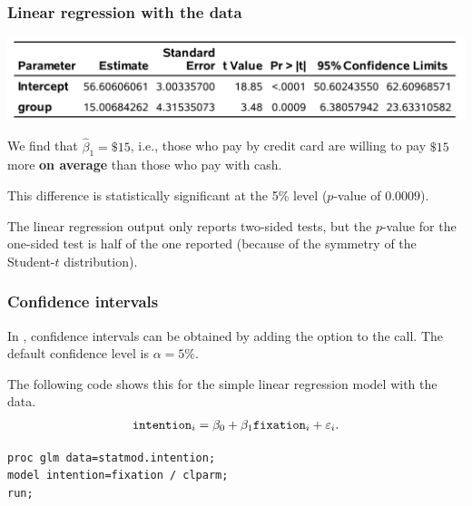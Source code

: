\documentclass{beamer}
\begin{document}
\begin{frame}[fragile]
\frametitle{Linear regression with the  data}
\begin{center}
\includegraphics[width =0.9\linewidth]{img/c2/slides3-e14}
\end{center}
\bi
\item We find that $\widehat{\beta}_1=\$15$, i.e., those who pay by credit card are willing to pay $\$15$ more \textbf{on average} than those who pay with cash. 
\item This difference is statistically significant at the 5\% level ($p$-value of $0.0009$).
\item The linear regression output only reports two-sided tests, but the $p$-value for the one-sided test is half of the one reported (because of the symmetry of the Student-$t$ distribution).
\ei
\end{frame}
 
 \begin{frame}[fragile]
\frametitle{Confidence intervals}
\bi
\item 
In \SASlang, confidence intervals can be obtained by adding the option  to the  call. The default confidence level is $\alpha=5\%$.
\item The following code shows this for the simple linear regression model with the  data.
\ei
\begin{align*}
\texttt{intention}_i = \beta_0 + \beta_1 \texttt{fixation}_i + \varepsilon_i.
\end{align*}

\begin{tcolorbox}[colback=white, colframe=hecblue, title=\SASlang code to fit the regression model with the \code{glm} procedure]
\begin{verbatim}
proc glm data=statmod.intention;
model intention=fixation / clparm;
run;
\end{verbatim}
\end{tcolorbox}


\end{frame}
\end{document}
